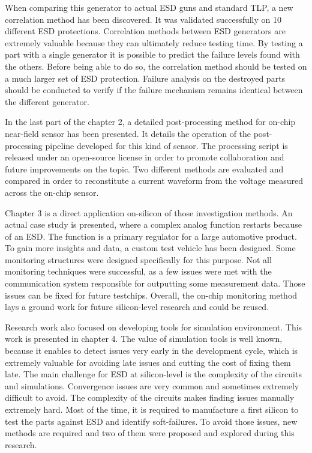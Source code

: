When comparing this generator to actual ESD guns and standard TLP, a new correlation method has been discovered.
It was validated successfully on 10 different ESD protections.
Correlation methods between ESD generators are extremely valuable because they can ultimately reduce testing time.
By testing a part with a single generator it is possible to predict the failure levels found with the others.
Before being able to do so, the correlation method should be tested on a much larger set of ESD protection.
Failure analysis on the destroyed parts should be conducted to verify if the failure mechanism remains identical between the different generator.

In the last part of the chapter 2, a detailed post-processing method for on-chip near-field sensor has been presented.
It details the operation of the post-processing pipeline developed for this kind of sensor.
The processing script is released \cite{} under an open-source license in order to promote collaboration and future improvements on the topic.
Two different methods are evaluated and compared in order to reconstitute a current waveform from the voltage measured across the on-chip sensor.

Chapter 3 is a direct application on-silicon of those investigation methods.
An actual case study is presented, where a complex analog function restarts because of an ESD.
The function is a primary regulator for a large automotive product.
To gain more insights and data, a custom test vehicle has been designed.
Some monitoring structures were designed specifically for this purpose.
Not all monitoring techniques were successful, as a few issues were met with the communication system responsible for outputting some measurement data.
Those issues can be fixed for future testchips.
Overall, the on-chip monitoring method lays a ground work for future silicon-level research and could be reused.

Research work also focused on developing tools for simulation environment.
This work is presented in chapter 4.
The value of simulation tools is well known, because it enables to detect issues very early in the development cycle, which is extremely valuable for avoiding late issues and cutting the cost of fixing them late.
The main challenge for ESD at silicon-level is the complexity of the circuits and simulations.
Convergence issues are very common and sometimes extremely difficult to avoid.
The complexity of the circuits makes finding issues manually extremely hard.
Most of the time, it is required to manufacture a first silicon to test the parts against ESD and identify soft-failures.
To avoid those issues, new methods are required and two of them were proposed and explored during this research.

